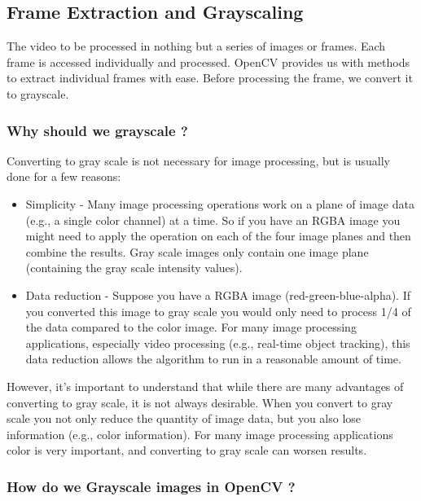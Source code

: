 \documentclass[12pt, a4paper]{article}
\begin{document}
\begin{large}\subsection{Frame Extraction and Grayscaling}\end{large}
\hspace{3cm}
The video to be processed in nothing but a series of images or frames. Each frame is accessed individually and processed. OpenCV provides us with methods to extract individual frames with ease. Before processing the frame, we convert it to grayscale.
\\
\begin{large}\subsubsection{Why should we grayscale ?}\end{large}
\hspace{3cm}
Converting to gray scale is not necessary for image processing, but is usually done for a few reasons:
\begin{itemize}
\item Simplicity - Many image processing operations work on a plane of image data (e.g., a single color channel) at a time. So if you have an RGBA image you might need to apply the operation on each of the four image planes and then combine the results. Gray scale images only contain one image plane (containing the gray scale intensity values).
\item Data reduction - Suppose you have a RGBA image (red-green-blue-alpha). If you converted this image to gray scale you would only need to process 1/4 of the data compared to the color image. For many image processing applications, especially video processing (e.g., real-time object tracking), this data reduction allows the algorithm to run in a reasonable amount of time.
\end{itemize}
However, it's important to understand that while there are many advantages of converting to gray scale, it is not always desirable. When you convert to gray scale you not only reduce the quantity of image data, but you also lose information (e.g., color information). For many image processing applications color is very important, and converting to gray scale can worsen results.
\begin{large}\subsubsection{How do we Grayscale images in OpenCV ?}\end{large}
\end{document}
